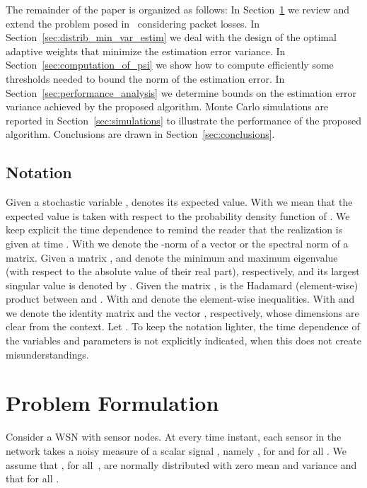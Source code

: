 \documentclass[a4paper,notitlepage,onecolumn]{article}
\numberwithin{equation}{section}
\begin{document}
The remainder of the paper is organized as follows: In
Section~\ref{sec:problem_formulation} we review and extend the
problem posed in~\cite{JSAC07} considering packet losses. In
Section~\ref{sec:distrib_min_var_estim} we deal with the design of
the optimal adaptive weights that minimize the estimation error
variance. In Section~\ref{sec:computation_of_psi} we show how to
compute efficiently some thresholds needed to bound the norm of
the estimation error. In Section~\ref{sec:performance_analysis} we
determine bounds on the estimation error variance achieved by the
proposed algorithm. Monte Carlo simulations are reported in
Section~\ref{sec:simulations} to illustrate the performance of the
proposed algorithm. Conclusions are drawn in
Section~\ref{sec:conclusions}.





\subsection{Notation}
\label{subsection:notation} Given a stochastic variable ,  denotes its expected value. With  we mean that the
expected value is taken with respect to the probability density
function of .  We keep
explicit the time dependence to remind the reader that the
realization is given at time . With  we denote the
-norm of a vector or the spectral norm of a matrix. Given
a matrix ,  and  denote the
minimum and maximum eigenvalue (with respect to the absolute value
of their real part), respectively, and its largest singular value
is denoted by . Given the matrix , 
is the Hadamard (element-wise) product between  and . With
 and  denote the element-wise
inequalities. With  and  we denote the identity matrix and
the vector , respectively, whose dimensions are
clear from the context. Let . To keep the
notation lighter, the time dependence of the variables and
parameters is not explicitly indicated, when this does not create
misunderstandings.

\section{Problem Formulation}
\label{sec:problem_formulation}

Consider a WSN with  sensor nodes. At every time instant,
each sensor in the network takes a noisy measure  of a
scalar signal , namely , for 
and for all . We assume that , for all~,
are normally distributed with zero mean and variance 
and that  for all .
\end{document}
